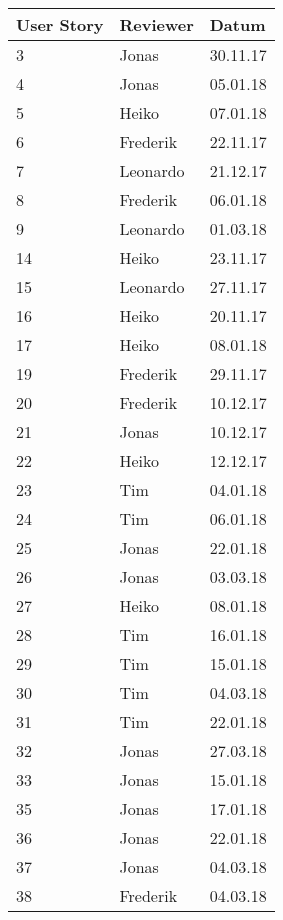 \begin{center}
\begin{tabular}{|l|l|l|}
    \hline
    User Story & Reviewer & Datum \\\hline\hline
    3  & Jonas      & 30.11.17 \\\hline
    4  & Jonas      & 05.01.18 \\\hline
    5  & Heiko      & 07.01.18 \\\hline
    6  & Frederik   & 22.11.17 \\\hline
    7  & Leonardo   & 21.12.17 \\\hline
    8  & Frederik   & 06.01.18 \\\hline
    9  & Leonardo   & 01.03.18 \\\hline
    14 & Heiko      & 23.11.17 \\\hline
    15 & Leonardo   & 27.11.17 \\\hline
    16 & Heiko      & 20.11.17 \\\hline
    17 & Heiko      & 08.01.18\\\hline
    19 & Frederik   & 29.11.17\\\hline
    20 & Frederik   & 10.12.17\\\hline
    21 & Jonas      & 10.12.17\\\hline
    22 & Heiko      & 12.12.17\\\hline
    23 & Tim        & 04.01.18\\\hline
    24 & Tim        & 06.01.18\\\hline
    25 & Jonas      & 22.01.18 \\\hline
    26 & Jonas      & 03.03.18 \\\hline
    27 & Heiko      & 08.01.18 \\\hline
    28 & Tim        & 16.01.18 \\\hline
    29 & Tim        & 15.01.18 \\\hline
    30 & Tim        & 04.03.18 \\\hline
    31 & Tim        & 22.01.18 \\\hline
    32 & Jonas      & 27.03.18 \\\hline
    33 & Jonas      & 15.01.18 \\\hline
    35 & Jonas      & 17.01.18 \\\hline
    36 & Jonas      & 22.01.18 \\\hline
    37 & Jonas      & 04.03.18 \\\hline
    38 & Frederik   & 04.03.18 \\\hline

\end{tabular}
\end{center}
